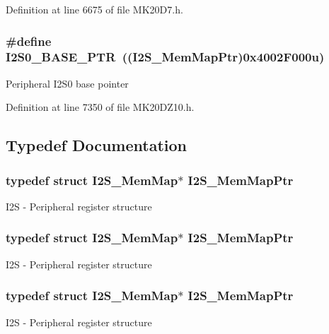 Definition at line 6675 of file M\+K20\+D7.\+h.

\subsubsection[{\texorpdfstring{I2\+S0\+\_\+\+B\+A\+S\+E\+\_\+\+P\+TR}{I2S0_BASE_PTR}}]{\setlength{\rightskip}{0pt plus 5cm}\#define I2\+S0\+\_\+\+B\+A\+S\+E\+\_\+\+P\+TR~(({\bf I2\+S\+\_\+\+Mem\+Map\+Ptr})0x4002\+F000u)}\hypertarget{group___i2_s___peripheral_ga2eac5d85244610150239927c71b2e147}{}\label{group___i2_s___peripheral_ga2eac5d85244610150239927c71b2e147}
Peripheral I2\+S0 base pointer 

Definition at line 7350 of file M\+K20\+D\+Z10.\+h.



\subsection{Typedef Documentation}
\subsubsection[{\texorpdfstring{I2\+S\+\_\+\+Mem\+Map\+Ptr}{I2S_MemMapPtr}}]{\setlength{\rightskip}{0pt plus 5cm}typedef struct {\bf I2\+S\+\_\+\+Mem\+Map}$\ast$ {\bf I2\+S\+\_\+\+Mem\+Map\+Ptr}}\hypertarget{group___i2_s___peripheral_ga13144089ddabdfb4b30ae97b2ac9c859}{}\label{group___i2_s___peripheral_ga13144089ddabdfb4b30ae97b2ac9c859}
I2S -\/ Peripheral register structure 
\subsubsection[{\texorpdfstring{I2\+S\+\_\+\+Mem\+Map\+Ptr}{I2S_MemMapPtr}}]{\setlength{\rightskip}{0pt plus 5cm}typedef struct {\bf I2\+S\+\_\+\+Mem\+Map}$\ast$ {\bf I2\+S\+\_\+\+Mem\+Map\+Ptr}}\hypertarget{group___i2_s___peripheral_ga13144089ddabdfb4b30ae97b2ac9c859}{}\label{group___i2_s___peripheral_ga13144089ddabdfb4b30ae97b2ac9c859}
I2S -\/ Peripheral register structure 
\subsubsection[{\texorpdfstring{I2\+S\+\_\+\+Mem\+Map\+Ptr}{I2S_MemMapPtr}}]{\setlength{\rightskip}{0pt plus 5cm}typedef struct {\bf I2\+S\+\_\+\+Mem\+Map}$\ast$ {\bf I2\+S\+\_\+\+Mem\+Map\+Ptr}}\hypertarget{group___i2_s___peripheral_ga13144089ddabdfb4b30ae97b2ac9c859}{}\label{group___i2_s___peripheral_ga13144089ddabdfb4b30ae97b2ac9c859}
I2S -\/ Peripheral register structure 